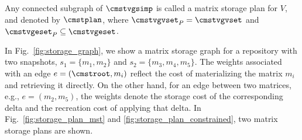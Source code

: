 \documentclass[conference]{IEEEtran}
\begin{document}
\begin{definition} Any connected subgraph of $\cmstvgsimp$ is called a matrix storage plan for $V$, and denoted by $\cmstplan$, where $\cmstvgvset_P = \cmstvgvset$ and $\cmstvgeset_P \subseteq \cmstvgeset$.
\end{definition}

\begin{example}
In Fig.~\ref{fig:storage_graph}, we show a matrix storage graph for a repository with two snapshots, $s_1 =\{m_1,m_2\}$ and $s_2 =\{m_3,m_4,m_5\}$. The weights associated with an edge $e = (\cmstroot, m_i)$ reflect the cost of materializing the matrix $m_i$ and retrieving it directly. On the other hand, for an edge between two matrices, e.g., $e = (m_2, m_5)$, the weights denote the storage cost of the corresponding delta and the recreation cost of applying that delta. In Fig.~\ref{fig:storage_plan_mst} and \ref{fig:storage_plan_constrained}, two matrix storage plans are shown. %
\end{example}
\end{document}
